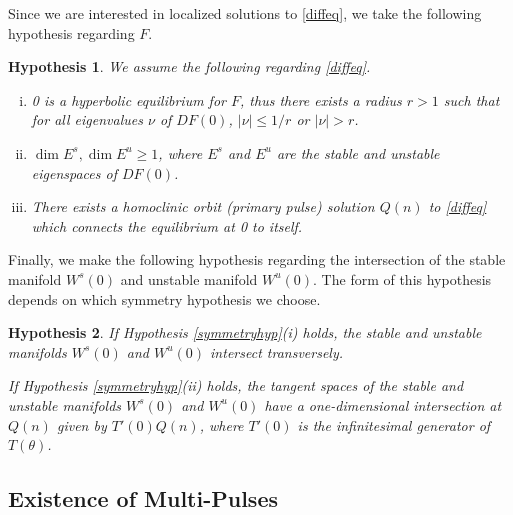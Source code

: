 \documentclass[12pt]{article}
\newtheorem{hypothesis}{Hypothesis}
\begin{document}
Since we are interested in localized solutions to \eqref{diffeq}, we take the following hypothesis regarding $F$.

\begin{hypothesis}\label{initialhyp}
We assume the following regarding \eqref{diffeq}.
\begin{enumerate}[(i)]
\item 0 is a hyperbolic equilibrium for $F$, thus there exists a radius $r > 1$ such that for all eigenvalues $\nu$ of $DF(0)$, $|\nu| \leq 1/r$ or $|\nu| > r$.
\item $\dim E^s, \dim E^u \geq 1$, where $E^s$ and $E^u$ are the stable and unstable eigenspaces of $DF(0)$.
\item There exists a homoclinic orbit (primary pulse) solution $Q(n)$ to \eqref{diffeq} which connects the equilibrium at 0 to itself.
\end{enumerate}
\end{hypothesis}

Finally, we make the following hypothesis regarding the intersection of the stable manifold $W^s(0)$ and unstable manifold $W^u(0)$. The form of this hypothesis depends on which symmetry hypothesis we choose.

\begin{hypothesis}\label{intersectionhyp}
If Hypothesis \ref{symmetryhyp}(i) holds, the stable and unstable manifolds $W^s(0)$ and $W^u(0)$ intersect transversely.

If Hypothesis \ref{symmetryhyp}(ii) holds, the tangent spaces of the stable and unstable manifolds $W^s(0)$ and $W^u(0)$ have a one-dimensional intersection at $Q(n)$ given by $T'(0) Q(n)$, where $T'(0)$ is the infinitesimal generator of $T(\theta)$.
\end{hypothesis}

\subsection{Existence of Multi-Pulses}
\end{document}

